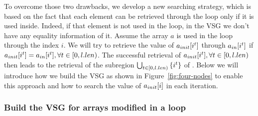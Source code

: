 To overcome those two drawbacks, we develop a new searching strategy, which  is based on the fact that each element can be retrieved through the loop only if it is used inside.
Indeed, if that element is not used in the loop, in the VSG we don't have any equality information of it. 
Assume the array $a$ is used in the loop through the index $i$.
We will try to retrieve the value of $a_{init}[i^t]$ through $a_{in}[i^t]$  if $a_{init}[i^t]=a_{in}[i^t], \forall t\in [0,l.len)$.
The successful retrieval of $a_{init}[i^t],\forall t\in [0,l.len)$ then leads to the retrieval of the subregion $\bigcup_{t\in [0,l.len)}{\{i^t\}}$ of \AIn.
Below we will introduce how we build the VSG as shown in Figure~\ref{fig:four-nodes}  to enable this approach and how to search the value of $a_{init}[i]$ in each iteration.





\subsubsection{Build the VSG for arrays modified in a loop}


